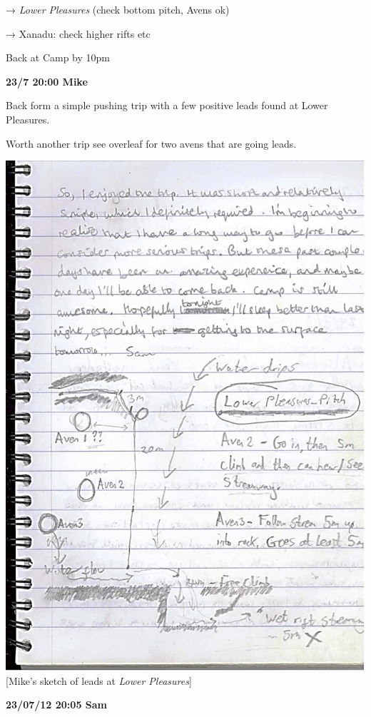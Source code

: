 → \emph{Lower Pleasures} (check bottom pitch, Avens ok)

→ Xanadu: check higher rifts etc

Back at Camp by 10pm

\textbf{23/7 20:00 Mike}

Back form a simple pushing trip with a few positive leads found at Lower
Pleasures.

Worth another trip see overleaf for two avens that are going leads.

\includegraphics{UgLog1012/73.jpeg}\\
{[}Mike's sketch of leads at \emph{Lower Pleasures}{]}

\textbf{23/07/12 20:05 Sam}

